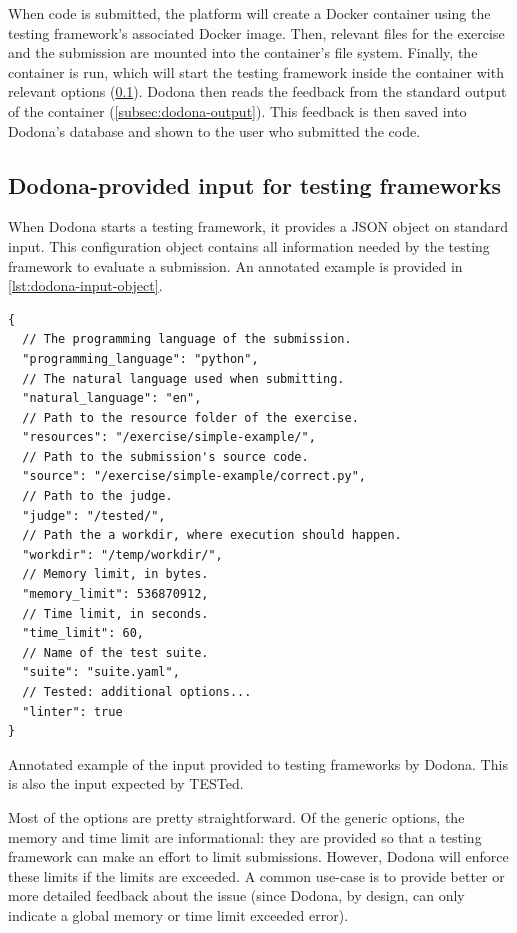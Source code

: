 \documentclass[../main]{subfiles}
\begin{document}
When code is submitted, the platform will create a Docker container using the testing framework's associated Docker image.
Then, relevant files for the exercise and the submission are mounted into the container's file system.
Finally, the container is run, which will start the testing framework inside the container with relevant options (\cref{subsec:dodona-input}).
Dodona then reads the feedback from the standard output of the container (\cref{subsec:dodona-output}).
This feedback is then saved into Dodona's database and shown to the user who submitted the code.

\subsection{Dodona-provided input for testing frameworks}\label{subsec:dodona-input}

When Dodona starts a testing framework, it provides a JSON object on standard input.
This configuration object contains all information needed by the testing framework to evaluate a submission.
An annotated example is provided in \cref{lst:dodona-input-object}.

\begin{listing}
    \begin{verbatim}
{
  // The programming language of the submission.
  "programming_language": "python",
  // The natural language used when submitting.
  "natural_language": "en",
  // Path to the resource folder of the exercise.
  "resources": "/exercise/simple-example/",
  // Path to the submission's source code.
  "source": "/exercise/simple-example/correct.py",
  // Path to the judge.
  "judge": "/tested/",
  // Path the a workdir, where execution should happen.
  "workdir": "/temp/workdir/",
  // Memory limit, in bytes.
  "memory_limit": 536870912,
  // Time limit, in seconds.
  "time_limit": 60,
  // Name of the test suite.
  "suite": "suite.yaml",
  // Tested: additional options...
  "linter": true
}
    \end{verbatim}
    \caption{
        Annotated example of the input provided to testing frameworks by Dodona.
        This is also the input expected by TESTed.
    }
    \label{lst:dodona-input-object}
\end{listing}

Most of the options are pretty straightforward.
Of the generic options, the memory and time limit are informational: they are provided so that a testing framework can make an effort to limit submissions.
However, Dodona will enforce these limits if the limits are exceeded.
A common use-case is to provide better or more detailed feedback about the issue (since Dodona, by design, can only indicate a global memory or time limit exceeded error).
\end{document}

